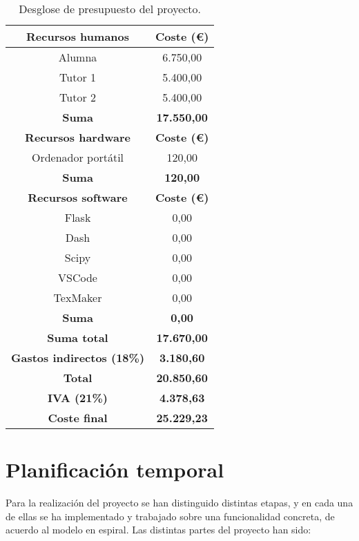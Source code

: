 \begin{table}[!h]
\caption{Desglose de presupuesto del proyecto.}
\begin{center}
\begin{tabular}{|c c|} 
 \hline
 \textbf{Recursos humanos} & \textbf{Coste (€)} \\ 
 \hline\hline
 Alumna & 6.750,00 \\
 \hline
 Tutor 1 & 5.400,00 \\
 \hline 
 Tutor 2 & 5.400,00 \\
 \textbf{Suma} & \textbf{17.550,00} \\
 \hline
 \textbf{Recursos hardware} & \textbf{Coste (€)} \\ 
 \hline\hline
 Ordenador portátil & 120,00 \\
 \hline
 \textbf{Suma} & \textbf{120,00} \\
 \hline 
 \textbf{Recursos software} & \textbf{Coste (€)} \\
 \hline
  Flask & 0,00 \\
  \hline
  Dash & 0,00 \\
  \hline 
  Scipy & 0,00 \\
  \hline 
  VSCode & 0,00 \\
  \hline
  TexMaker & 0,00 \\
  \hline 
  \textbf{Suma} & \textbf{0,00} \\ 
 \hline\hline
 \textbf{Suma total} & \textbf{17.670,00} \\
 \hline\hline
 \textbf{Gastos indirectos (18\%)} & \textbf{3.180,60} \\ 
 \hline\hline
 \textbf{Total} & \textbf{20.850,60} \\ 
 \hline\hline
 \textbf{IVA (21\%)} & \textbf{4.378,63} \\ %
 \hline\hline
 \textbf{Coste final} & \textbf{25.229,23} \\  %
 \hline\hline

 \hline
\end{tabular}
\label{tabla_pres}
\end{center}
\end{table}

\section{Planificación temporal}

Para la realización del proyecto se han distinguido distintas etapas, y en cada una de ellas se ha implementado y trabajado sobre una funcionalidad concreta, de acuerdo al modelo en espiral. Las distintas partes del proyecto han sido:

